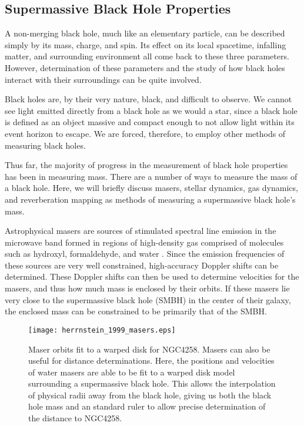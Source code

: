 \subsection{Supermassive Black Hole Properties}

A non-merging black hole, much like an elementary particle, can be described simply by its mass, charge, and spin.  Its effect on its local spacetime, infalling matter, and surrounding environment all come back to these three parameters.  However, determination of these parameters and the study of how black holes interact with their surroundings can be quite involved.



Black holes are, by their very nature, black, and difficult to observe.  We cannot see light emitted directly from a black hole as we would a star, since a black hole is defined as an object massive and compact enough to not allow light within its event horizon to escape.  We are forced, therefore, to employ other methods of measuring black holes.

Thus far, the majority of progress in the measurement of black hole properties has been in measuring mass.  There are a number of ways to measure the mass of a black hole.  Here, we will briefly discuss masers, stellar dynamics, gas dynamics, and reverberation mapping as methods of measuring a supermassive black hole's mass.

Astrophysical masers are sources of stimulated spectral line emission in the microwave band formed in regions of high-density gas comprised of molecules such as hydroxyl, formaldehyde, and water \citep{lo_2005}.  Since the emission frequencies of these sources are very well constrained, high-accuracy Doppler shifts can be determined.  These Doppler shifts can then be used to determine velocities for the masers, and thus how much mass is enclosed by their orbits.  If these masers lie very close to the supermassive black hole (SMBH) in the center of their galaxy, the enclosed mass can be constrained to be primarily that of the SMBH.

\begin{figure}[t]
\centering
\texttt{[image: herrnstein\_1999\_masers.eps]}
\caption[Maser orbits fit to a warped disk for NGC4258]{\footnotesize Maser orbits fit to a warped disk for NGC4258.  Masers can also be useful for distance determinations.  Here, the positions and velocities of water masers are able to be fit to a warped disk model surrounding a supermassive black hole.  This allows the interpolation of physical radii away from the black hole, giving us both the black hole mass and an standard ruler to allow precise determination of the distance to NGC4258.  \citep{herrnstein_1999}}
\label{fig:masers}
\end{figure}

